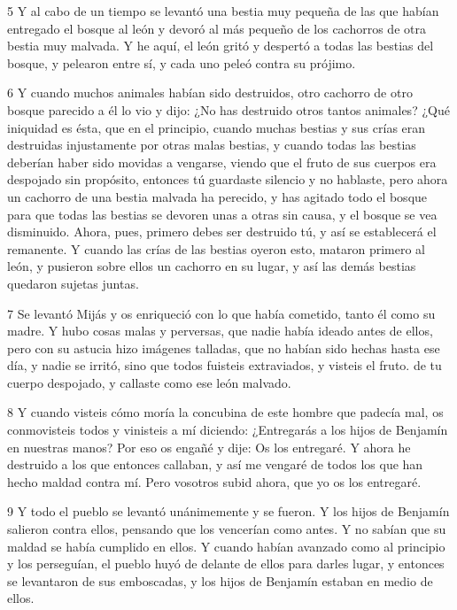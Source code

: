 \par 5 Y al cabo de un tiempo se levantó una bestia muy pequeña de las que habían entregado el bosque al león y devoró al más pequeño de los cachorros de otra bestia muy malvada. Y he aquí, el león gritó y despertó a todas las bestias del bosque, y pelearon entre sí, y cada uno peleó contra su prójimo.

\par 6 Y cuando muchos animales habían sido destruidos, otro cachorro de otro bosque parecido a él lo vio y dijo: ¿No has destruido otros tantos animales? ¿Qué iniquidad es ésta, que en el principio, cuando muchas bestias y sus crías eran destruidas injustamente por otras malas bestias, y cuando todas las bestias deberían haber sido movidas a vengarse, viendo que el fruto de sus cuerpos era despojado sin propósito, entonces tú guardaste silencio y no hablaste, pero ahora un cachorro de una bestia malvada ha perecido, y has agitado todo el bosque para que todas las bestias se devoren unas a otras sin causa, y el bosque se vea disminuido. Ahora, pues, primero debes ser destruido tú, y así se establecerá el remanente. Y cuando las crías de las bestias oyeron esto, mataron primero al león, y pusieron sobre ellos un cachorro en su lugar, y así las demás bestias quedaron sujetas juntas.

\par 7 Se levantó Mijás y os enriqueció con lo que había cometido, tanto él como su madre. Y hubo cosas malas y perversas, que nadie había ideado antes de ellos, pero con su astucia hizo imágenes talladas, que no habían sido hechas hasta ese día, y nadie se irritó, sino que todos fuisteis extraviados, y visteis el fruto. de tu cuerpo despojado, y callaste como ese león malvado.

\par 8 Y cuando visteis cómo moría la concubina de este hombre que padecía mal, os conmovisteis todos y vinisteis a mí diciendo: ¿Entregarás a los hijos de Benjamín en nuestras manos? Por eso os engañé y dije: Os los entregaré. Y ahora he destruido a los que entonces callaban, y así me vengaré de todos los que han hecho maldad contra mí. Pero vosotros subid ahora, que yo os los entregaré.

\par 9 Y todo el pueblo se levantó unánimemente y se fueron. Y los hijos de Benjamín salieron contra ellos, pensando que los vencerían como antes. Y no sabían que su maldad se había cumplido en ellos. Y cuando habían avanzado como al principio y los perseguían, el pueblo huyó de delante de ellos para darles lugar, y entonces se levantaron de sus emboscadas, y los hijos de Benjamín estaban en medio de ellos.

